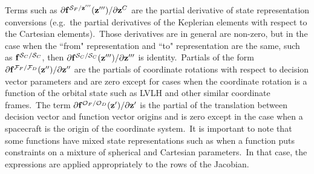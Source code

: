%
Terms such as $\partial \mathbf{f}^{\mathcal{S}_F / \mathbf{z}'''}(\mathbf{z}''')/\partial\mathbf{z}^{C}$ are the partial derivative of state representation conversions (e.g.~the partial derivatives of the Keplerian elements with respect to the Cartesian elements).~Those derivatives are in general are non-zero, but in the case when the ``from" representation and ``to" representation are the same, such as $\mathbf{f}^{\mathcal{S}_C / \mathcal{S}_C}$, then $\partial \mathbf{f}^{\mathcal{S}_C / \mathcal{S}_C}(\mathbf{z}''')/\partial\mathbf{z}'''$ is identity.~Partials of the form $\partial \mathbf{f}^{\mathcal{F}_F / \mathcal{F}_D}(\mathbf{z}'')/\partial \mathbf{z}''$ are the partials of coordinate rotations with respect to decision vector parameters and are zero except for cases when the coordinate rotation is a function of the orbital state such as LVLH and other similar coordinate frames.~The term $\partial \mathbf{f}^{\mathcal{O}_F / \mathcal{O}_D}(\mathbf{z}')/ \partial \mathbf{z}'$ is the partial of the translation between decision vector and function vector origins and is zero except in the case when a spacecraft is the origin of the coordinate system.~It is important to note that some functions have mixed state representations such as when a function puts constraints on a mixture of spherical and Cartesian parameters.~In that case, the expressions are applied appropriately to the rows of the Jacobian.

